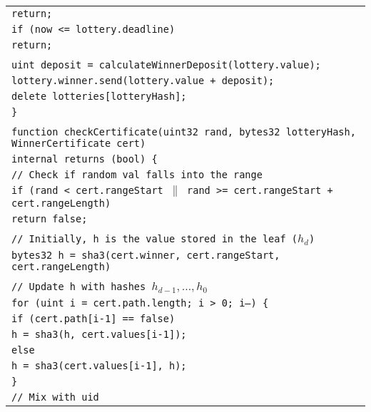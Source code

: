 \documentclass[a4paper]{article}
\begin{document}
\begin{tabularx}{\linewidth}{l}
        \qquad\qquad\qquad\texttt{return;}\\
        \qquad\qquad\texttt{if (now <= lottery.deadline)}\\
        \qquad\qquad\qquad\texttt{return;}\\
        \\
        \qquad\qquad\texttt{uint deposit = calculateWinnerDeposit(lottery.value);}\\
        \qquad\qquad\texttt{lottery.winner.send(lottery.value + deposit);}\\
        \qquad\qquad\texttt{delete lotteries[lotteryHash];}\\
        \qquad\texttt{\}}\\
        \\
        \qquad\texttt{function checkCertificate(uint32 rand, bytes32 lotteryHash, WinnerCertificate cert)}\\
        \qquad\qquad\qquad\qquad\qquad\qquad\qquad\qquad\texttt{internal returns (bool) \{}\\
        \qquad\qquad\texttt{// Check if~random val falls into~the~range}\\
        \qquad\qquad\texttt{if (rand < cert.rangeStart $\|$ rand >= cert.rangeStart + cert.rangeLength)}\\
        \qquad\qquad\qquad\texttt{return false;}\\
        \\
        \qquad\qquad\texttt{// Initially, h is~the~value stored in~the~leaf ($h_d$)}\\
        \qquad\qquad\texttt{bytes32 h = sha3(cert.winner, cert.rangeStart, cert.rangeLength)}\\
        \\
        \qquad\qquad\texttt{// Update h with~hashes $h_{d-1}, \ldots, h_0$}\\
        \qquad\qquad\texttt{for (uint i = cert.path.length; i > 0; i--) \{}\\
        \qquad\qquad\qquad\texttt{if (cert.path[i-1] == false)}\\
        \qquad\qquad\qquad\qquad\texttt{h = sha3(h, cert.values[i-1]);}\\
        \qquad\qquad\qquad\texttt{else}\\
        \qquad\qquad\qquad\qquad\texttt{h = sha3(cert.values[i-1], h);}\\
        \qquad\qquad\qquad\texttt{\}}\\
        \qquad\qquad\texttt{// Mix with~uid}\\

\end{tabularx}
\end{document}
